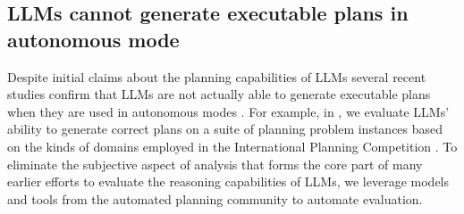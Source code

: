 \documentclass{article}
\newcommand{\rao}[1]{\noindent\textcolor{red}{#1}}
\theoremstyle{plain}
\theoremstyle{definition}
\theoremstyle{remark}
\begin{document}
\subsection{LLMs cannot generate executable plans in autonomous mode}


Despite initial claims about the planning capabilities of LLMs
\cite{bairi2023codeplan, yao2023react, shinn2023reflexion,
  huang2022inner, hao2023reasoning} several recent studies
confirm that LLMs are not actually able to generate executable plans
when they are used in autonomous modes
\cite{valmeekam2023on,liu2023llm+,silver2022pddl}. For example, in
\cite{valmeekam2023on,valmeekam2023planbench}, we evaluate LLMs' ability to generate correct plans on a suite of planning problem instances
based on the kinds of domains employed in the International Planning Competition \cite{ipc}. 
To eliminate the subjective aspect of analysis that forms the core part
of many earlier efforts to evaluate the reasoning capabilities of
LLMs, we leverage models and tools from the automated planning community to automate evaluation. 
\end{document}
